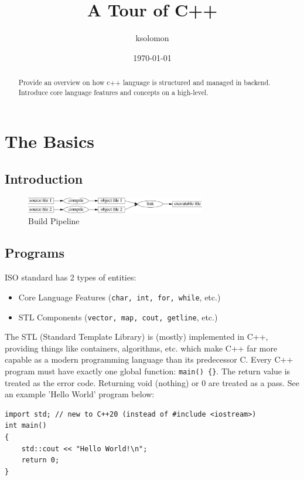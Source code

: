 \documentclass[a4paper, 10pt]{article}
\title{A Tour of C++}
\author{ksolomon}
\date{\today}
\begin{document}
\maketitle

\begin{abstract}
	Provide an overview on how c++ language is structured and managed in backend. Introduce core language features and concepts on a high-level.
\end{abstract}



\section{The Basics}
\subsection{Introduction}
\begin{figure}[ht]
	\centering
	\includegraphics[width=0.7\textwidth]{linker.png}
	\caption{Build Pipeline}
\end{figure}

\subsection{Programs}
ISO standard has 2 types of entities:
\begin{itemize}
	\item Core Language Features (\verb!char, int, for, while!, etc.)
	\item STL Components (\verb!vector, map, cout, getline!, etc.)
\end{itemize}
The STL (Standard Template Library) is (mostly) implemented in C++, providing things like containers, algorithms, etc. which make C++ far more capable as a modern programming language than its predecessor C.
Every C++ program must have exactly one global function: \verb!main() {}!. The return value is treated as the error code. Returning void (nothing) or 0 are treated as a pass. See an example 'Hello World' program below:
\begin{lstlisting}[style=cpp]
import std; // new to C++20 (instead of #include <iostream>)
int main()
{
    std::cout << "Hello World!\n";
    return 0;
}
\end{lstlisting}
\end{document}
